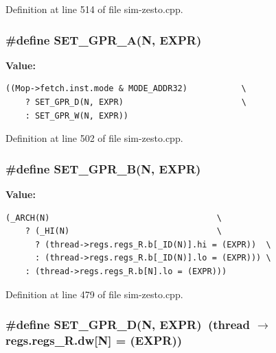 Definition at line 514 of file sim-zesto.cpp.
\subsubsection[{SET\_\-GPR\_\-A}]{\setlength{\rightskip}{0pt plus 5cm}\#define SET\_\-GPR\_\-A(N, \/  EXPR)}\label{sim-zesto_8cpp_aaad11abd50c2dc2ff406fa27cf7678f}


\textbf{Value:}

\begin{Code}\begin{verbatim}((Mop->fetch.inst.mode & MODE_ADDR32)           \
    ? SET_GPR_D(N, EXPR)                        \
    : SET_GPR_W(N, EXPR))
\end{verbatim}
\end{Code}


Definition at line 502 of file sim-zesto.cpp.
\subsubsection[{SET\_\-GPR\_\-B}]{\setlength{\rightskip}{0pt plus 5cm}\#define SET\_\-GPR\_\-B(N, \/  EXPR)}\label{sim-zesto_8cpp_d033dd2415fd695c9d1e8318b6341a2e}


\textbf{Value:}

\begin{Code}\begin{verbatim}(_ARCH(N)                                  \
    ? (_HI(N)                              \
      ? (thread->regs.regs_R.b[_ID(N)].hi = (EXPR))  \
      : (thread->regs.regs_R.b[_ID(N)].lo = (EXPR))) \
    : (thread->regs.regs_R.b[N].lo = (EXPR)))
\end{verbatim}
\end{Code}


Definition at line 479 of file sim-zesto.cpp.
\subsubsection[{SET\_\-GPR\_\-D}]{\setlength{\rightskip}{0pt plus 5cm}\#define SET\_\-GPR\_\-D(N, \/  EXPR)~(thread $\rightarrow$ regs.regs\_\-R.dw[N] = (EXPR))}\label{sim-zesto_8cpp_f479882a574ad1c3e8028a799c3c031d}




